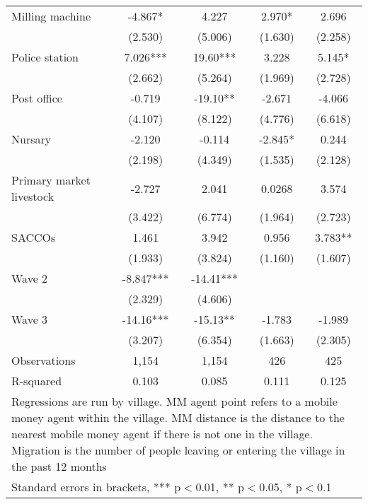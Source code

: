 \begin{table}[htbp]
{\begin{minipage}{\textwidth}
\begin{tabular}{lcccc}
Milling machine & -4.867* & 4.227 & 2.970* & 2.696 \\
 & (2.530) & (5.006) & (1.630) & (2.258) \\
Police station & 7.026*** & 19.60*** & 3.228 & 5.145* \\
 & (2.662) & (5.264) & (1.969) & (2.728) \\
Post office & -0.719 & -19.10** & -2.671 & -4.066 \\
 & (4.107) & (8.122) & (4.776) & (6.618) \\
Nursary & -2.120 & -0.114 & -2.845* & 0.244 \\
 & (2.198) & (4.349) & (1.535) & (2.128) \\
Primary market livestock & -2.727 & 2.041 & 0.0268 & 3.574 \\
 & (3.422) & (6.774) & (1.964) & (2.723) \\
SACCOs & 1.461 & 3.942 & 0.956 & 3.783** \\
 & (1.933) & (3.824) & (1.160) & (1.607) \\
 Wave 2 & -8.847*** & -14.41*** &  &  \\
 & (2.329) & (4.606) &  &  \\
Wave 3 & -14.16*** & -15.13** & -1.783 & -1.989 \\
 & (3.207) & (6.354) & (1.663) & (2.305) \\
Observations & 1,154 & 1,154 & 426 & 425 \\
 R-squared & 0.103 & 0.085 & 0.111 & 0.125 \\ \hline
\multicolumn{5}{p{13cm}}{Regressions are run by village. MM agent point refers to a mobile money agent within the village. MM distance is the distance to the nearest mobile money agent if there is not one in the village. Migration is the number of people leaving or entering the village in the past 12 months} \\
\multicolumn{5}{l}{ Standard errors in brackets, *** p$<$0.01, ** p$<$0.05, * p$<$0.1} \\
\end{tabular}
 \end{minipage}}
\end{table}%
